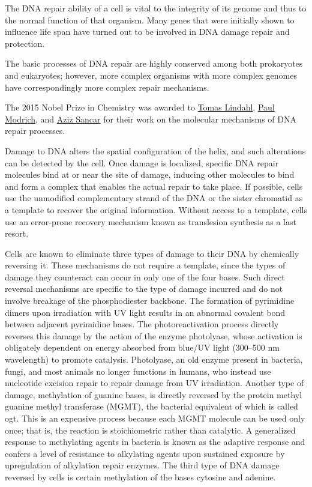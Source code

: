 The DNA repair ability of a cell is vital to the integrity of its genome and thus to the normal function of that organism. Many genes that were initially shown to influence life span have turned out to be involved in DNA damage repair and protection.

The basic processes of DNA repair are highly conserved among both prokaryotes and eukaryotes; however, more complex organisms with more complex genomes have correspondingly more complex repair mechanisms.

The 2015 Nobel Prize in Chemistry was awarded to \href{https://en.wikipedia.org/wiki/Tomas_Lindahl}{Tomas Lindahl}, \href{https://en.wikipedia.org/wiki/Paul_L._Modrich}{Paul Modrich}, and \href{https://en.wikipedia.org/wiki/Aziz_Sancar}{Aziz Sancar} for their work on the molecular mechanisms of DNA repair processes.

Damage to DNA alters the spatial configuration of the helix, and such alterations can be detected by the cell. Once damage is localized, specific DNA repair molecules bind at or near the site of damage, inducing other molecules to bind and form a complex that enables the actual repair to take place. If possible, cells use the unmodified complementary strand of the DNA or the sister chromatid as a template to recover the original information. Without access to a template, cells use an error-prone recovery mechanism known as translesion synthesis as a last resort.

Cells are known to eliminate three types of damage to their DNA by chemically reversing it. These mechanisms do not require a template, since the types of damage they counteract can occur in only one of the four bases. Such direct reversal mechanisms are specific to the type of damage incurred and do not involve breakage of the phosphodiester backbone. The formation of pyrimidine dimers upon irradiation with UV light results in an abnormal covalent bond between adjacent pyrimidine bases. The photoreactivation process directly reverses this damage by the action of the enzyme photolyase, whose activation is obligately dependent on energy absorbed from blue/UV light (300--500 nm wavelength) to promote catalysis. Photolyase, an old enzyme present in bacteria, fungi, and most animals no longer functions in humans, who instead use nucleotide excision repair to repair damage from UV irradiation. Another type of damage, methylation of guanine bases, is directly reversed by the protein methyl guanine methyl transferase (MGMT), the bacterial equivalent of which is called ogt. This is an expensive process because each MGMT molecule can be used only once; that is, the reaction is stoichiometric rather than catalytic. A generalized response to methylating agents in bacteria is known as the adaptive response and confers a level of resistance to alkylating agents upon sustained exposure by upregulation of alkylation repair enzymes. The third type of DNA damage reversed by cells is certain methylation of the bases cytosine and adenine.

